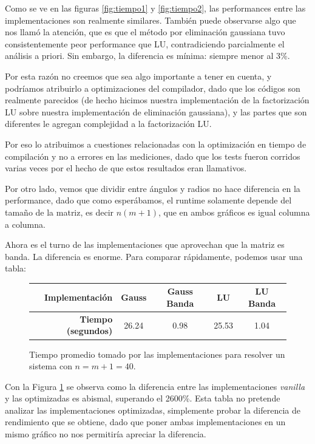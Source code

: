 Como se ve en las figuras \ref{fig:tiempo1} y \ref{fig:tiempo2}, las performances entre las implementaciones son realmente similares. También puede observarse algo que nos llamó la atención, que es que el método por eliminación gaussiana tuvo consistentemente peor performance que LU, contradiciendo parcialmente el análisis a priori. Sin embargo, la diferencia es mínima: siempre menor al 3\%.

Por esta razón no creemos que sea algo importante a tener en cuenta, y podríamos atribuirlo a optimizaciones del compilador, dado que los códigos son realmente parecidos (de hecho hicimos nuestra implementación de la factorización LU sobre nuestra implementación de eliminación gaussiana), y las partes que son diferentes le agregan complejidad a la factorización LU.

Por eso lo atribuimos a cuestiones relacionadas con la optimización en tiempo de compilación y no a errores en las mediciones, dado que los tests fueron corridos varias veces por el hecho de que estos resultados eran llamativos.


Por otro lado, vemos que dividir entre ángulos y radios no hace diferencia en la performance, dado que como esperábamos, el runtime solamente depende del tamaño de la matriz, es decir $n (m+1)$, que en ambos gráficos es igual columna a columna.


Ahora es el turno de las implementaciones que aprovechan que la matriz es banda.
La diferencia es enorme. Para comparar rápidamente, podemos usar una tabla:


\begin{figure}[H]
\centering
\begin{tabular}{|r | c  c  c  c|}
\hline
  \textbf{Implementación} & Gauss & Gauss Banda & LU & LU Banda\\ \hline
  \textbf{Tiempo (segundos)} & 26.24 & 0.98 & 25.53 & 1.04 \\
\hline
\end{tabular}

  \caption{\footnotesize{Tiempo promedio tomado por las implementaciones para resolver un sistema con $n = m+1 = 40$.}}
  \label{fig:tiempocomp}
\end{figure}

Con la Figura \ref{fig:tiempocomp} se observa como la diferencia entre las implementaciones \emph{vanilla} y las optimizadas es abismal, superando el 2600\%. Esta tabla no pretende analizar las implementaciones optimizadas, simplemente probar la diferencia de rendimiento que se obtiene, dado que poner ambas implementaciones en un mismo gráfico no nos permitiría apreciar la diferencia.

